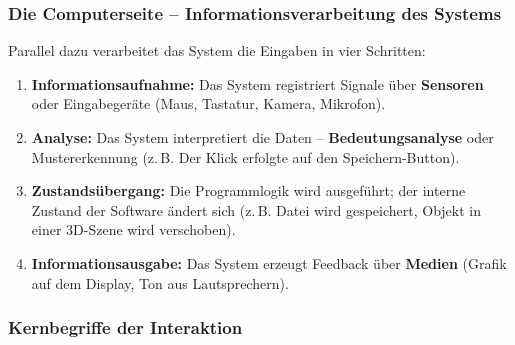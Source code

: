 \documentclass[12pt, a4paper]{article}
\begin{document}
\subsubsection{Die Computerseite -- Informationsverarbeitung des Systems}

Parallel dazu verarbeitet das System die Eingaben in vier Schritten:

\begin{enumerate}
  \item \textbf{Informationsaufnahme:} Das System registriert Signale über
        \textbf{Sensoren} oder Eingabegeräte (Maus, Tastatur, Kamera, Mikrofon).
  \item \textbf{Analyse:} Das System interpretiert die Daten -- \textbf{Bedeutungsanalyse}
        oder Mustererkennung (z.\,B. \glqq{}Der Klick erfolgte auf den Speichern-Button\grqq{}).
  \item \textbf{Zustandsübergang:} Die Programmlogik wird ausgeführt; der interne
        Zustand der Software ändert sich (z.\,B. Datei wird gespeichert, Objekt
        in einer 3D-Szene wird verschoben).
  \item \textbf{Informationsausgabe:} Das System erzeugt Feedback über \textbf{Medien}
        (Grafik auf dem Display, Ton aus Lautsprechern).
\end{enumerate}

\subsubsection{Kernbegriffe der Interaktion}
\end{document}
